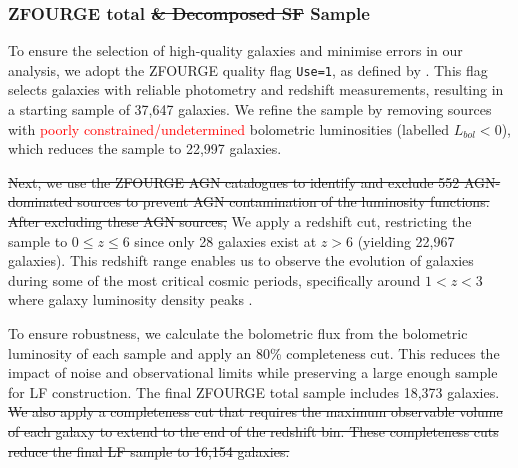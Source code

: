 \subsubsection{ZFOURGE total \sout{\& Decomposed SF} Sample} \label{Sec: Galaxy LF Selection}
To ensure the selection of high-quality galaxies and minimise errors in our analysis, we adopt the ZFOURGE quality flag \texttt{Use=1}, as defined by \cite{straatman_fourstar_2016}. This flag selects galaxies with reliable photometry and redshift measurements, resulting in a starting sample of 37,647 galaxies. We refine the sample by removing sources with \textcolor{red}{poorly constrained/undetermined} bolometric luminosities (labelled $L_{bol} < 0$), which reduces the sample to 22,997 galaxies.

\sout{Next, we use the ZFOURGE AGN catalogues to identify and exclude 552 AGN-dominated sources to prevent AGN contamination of the luminosity functions. After excluding these AGN sources,} We apply a redshift cut, restricting the sample to $0 \leq z \leq 6$ since only 28 galaxies exist at $z > 6$ (yielding  22,967 galaxies). This redshift range enables us to observe the evolution of galaxies during some of the most critical cosmic periods, specifically around $1 < z < 3$ \citep{gruppioni_modelling_2011, wylezalek_galaxy_2014} where galaxy luminosity density peaks \citep{assef_mid-ir-_2011}.

To ensure robustness, we calculate the bolometric flux from the bolometric luminosity of each sample and apply an 80\% completeness cut. This reduces the impact of noise and observational limits while preserving a large enough sample for LF construction. The final ZFOURGE total sample includes 18,373 galaxies. \sout{We also apply a completeness cut that requires the maximum observable volume of each galaxy to extend to the end of the redshift bin. These completeness cuts reduce the final LF sample to 16,154 galaxies.}

